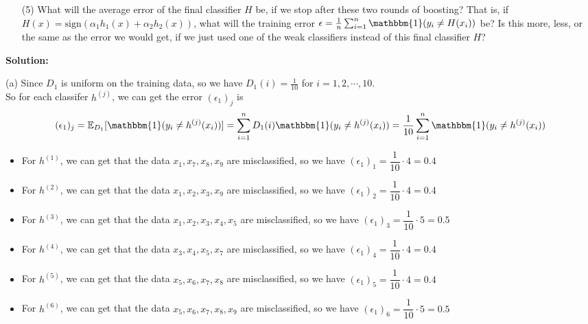 \documentclass[10pt]{article}
\begin{document}
\begin{enumerate}[1.]
\begin{itemize}
\begin{enumerate}
			        \item[(5)] What will the average error of the final classifier $H$ be, if we stop after these two rounds of boosting? That is, if $H(x) = \text{sign}(\alpha_{1}h_{1}(x) + \alpha_{2}h_{2}(x))$, what will the  training error $\epsilon = \frac{1}{n} \sum_{i=1}^{n} \mathbbm{1} (y_{i} \neq H(x_{i}))$ be? Is this more, less, or the same as the error we would get, if we just used one of the weak classifiers instead of this final classifier $H$?~\\

		        \end{enumerate}
        \end{itemize}
		\textbf{Solution:}

(a) Since $D_1$ is uniform on the training data, so we have $D_1(i)=\frac{1}{10}$ for $i=1,2,\cdots,10$.\\
So for each classifer $h^{(j)}$, we can get the error $(\epsilon_1)_j$ is
$$(\epsilon_1)_j=\mathbb{E}_{D_1}[\mathbbm{1}(y_{i} \neq h^{(j)}(x_{i}))]=\sum_{i=1}^{n} D_1(i)\mathbbm{1}(y_{i} \neq h^{(j)}(x_{i}))=\dfrac{1}{10}\sum_{i=1}^n\mathbbm{1}(y_{i} \neq h^{(j)}(x_{i}))$$

\begin{itemize}
    \item For $h^{(1)}$, we can get that the data $x_1, x_7, x_8, x_9$ are misclassified, so we have
    $(\epsilon_1)_1=\dfrac{1}{10}\cdot 4=0.4$
    
    \item For $h^{(2)}$, we can get that the data $x_1, x_2, x_3, x_9$ are misclassified, so we have
    $(\epsilon_1)_2=\dfrac{1}{10}\cdot 4=0.4$

    \item For $h^{(3)}$, we can get that the data $x_1, x_2, x_3, x_4, x_5$ are misclassified, so we have
    $(\epsilon_1)_3=\dfrac{1}{10}\cdot 5=0.5$

    \item For $h^{(4)}$, we can get that the data $x_3, x_4, x_5, x_7$ are misclassified, so we have
    $(\epsilon_1)_4=\dfrac{1}{10}\cdot 4=0.4$

    \item For $h^{(5)}$, we can get that the data $x_5, x_6, x_7, x_8$ are misclassified, so we have
    $(\epsilon_1)_5=\dfrac{1}{10}\cdot 4=0.4$

    \item For $h^{(6)}$, we can get that the data $x_5, x_6, x_7, x_8, x_9$ are misclassified, so we have
    $(\epsilon_1)_6=\dfrac{1}{10}\cdot 5=0.5$
\end{itemize}


\end{enumerate}
\end{document}
